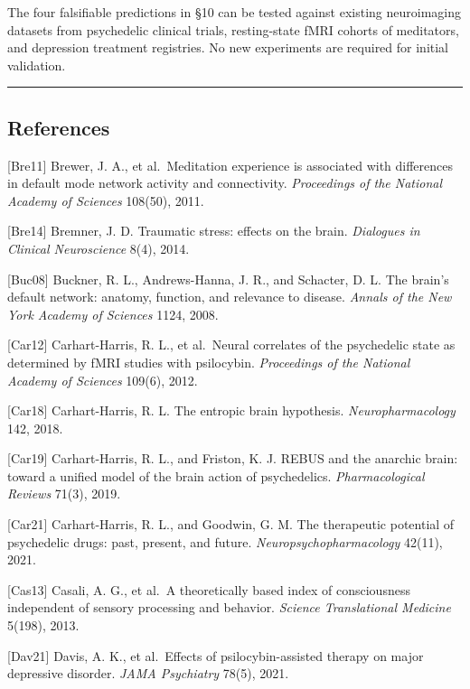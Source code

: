 \documentclass[
  11pt,
  letterpaper,
]{article}
\begin{document}
The four falsifiable predictions in §10 can be tested against existing
neuroimaging datasets from psychedelic clinical trials, resting-state
fMRI cohorts of meditators, and depression treatment registries. No new
experiments are required for initial validation.

\begin{center}\rule{0.5\linewidth}{0.5pt}\end{center}

\subsection{References}\label{references}

{[}Bre11{]} Brewer, J. A., et al.~Meditation experience is associated
with differences in default mode network activity and connectivity.
\emph{Proceedings of the National Academy of Sciences} 108(50), 2011.

{[}Bre14{]} Bremner, J. D. Traumatic stress: effects on the brain.
\emph{Dialogues in Clinical Neuroscience} 8(4), 2014.

{[}Buc08{]} Buckner, R. L., Andrews-Hanna, J. R., and Schacter, D. L.
The brain's default network: anatomy, function, and relevance to
disease. \emph{Annals of the New York Academy of Sciences} 1124, 2008.

{[}Car12{]} Carhart-Harris, R. L., et al.~Neural correlates of the
psychedelic state as determined by fMRI studies with psilocybin.
\emph{Proceedings of the National Academy of Sciences} 109(6), 2012.

{[}Car18{]} Carhart-Harris, R. L. The entropic brain hypothesis.
\emph{Neuropharmacology} 142, 2018.

{[}Car19{]} Carhart-Harris, R. L., and Friston, K. J. REBUS and the
anarchic brain: toward a unified model of the brain action of
psychedelics. \emph{Pharmacological Reviews} 71(3), 2019.

{[}Car21{]} Carhart-Harris, R. L., and Goodwin, G. M. The therapeutic
potential of psychedelic drugs: past, present, and future.
\emph{Neuropsychopharmacology} 42(11), 2021.

{[}Cas13{]} Casali, A. G., et al.~A theoretically based index of
consciousness independent of sensory processing and behavior.
\emph{Science Translational Medicine} 5(198), 2013.

{[}Dav21{]} Davis, A. K., et al.~Effects of psilocybin-assisted therapy
on major depressive disorder. \emph{JAMA Psychiatry} 78(5), 2021.
\end{document}

